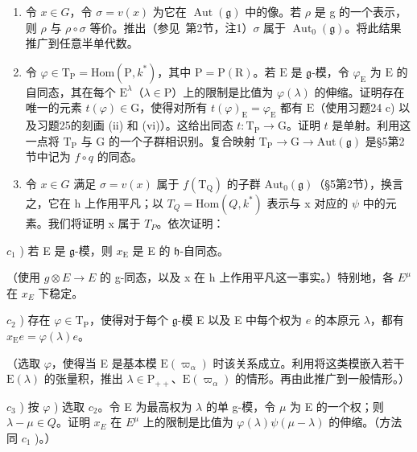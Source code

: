 \begin{enumerate}
\def\labelenumi{\alph{enumi})}
\item
  令 \(x \in G\)，令 \(\sigma = v(x)\) 为它在 \(\operatorname{Aut}(\mathfrak{g})\) 中的像。若 \(\rho\) 是 g 的一个表示，则 \(\rho\) 与 \(\rho \circ \sigma\) 等价。推出（参见~第2节，注1）\(\sigma\) 属于 \(\operatorname{Aut}_{0}(\mathfrak{g})\)。将此结果推广到任意半单代数。
\item
  令 \(\varphi \in \mathrm{T}_{\mathrm{P}} = \mathrm{Hom}(\mathrm{P}, k^{*})\)，其中 \(\mathrm{P} = \mathrm{P}(\mathrm{R})\)。若 \(\mathrm{E}\) 是 \(\mathfrak{g}\)-模，令 \(\varphi_{\mathrm{E}}\) 为 \(\mathrm{E}\) 的自同态，其在每个 \(\mathrm{E}^{\lambda}\)（\(\lambda \in \mathrm{P}\)）上的限制是比值为 \(\varphi(\lambda)\) 的伸缩。证明存在唯一的元素 \(t(\varphi) \in \mathrm{G}\)，使得对所有 \(t(\varphi)_{\mathrm{E}} = \varphi_{\mathrm{E}}\) 都有 \(\mathrm{E}\)（使用习题24 c) 以及习题25的刻画 (ii) 和 (vi)）。这给出同态 \(t: \mathrm{T}_{\mathrm{P}} \to \mathrm{G}\)。证明 \(t\) 是单射。利用这一点将 \(\mathrm{T}_{\mathrm{P}}\) 与 \(\mathrm{G}\) 的一个子群相识别。复合映射 \(\mathrm{T}_{\mathrm{P}} \to \mathrm{G} \to \mathrm{Aut}(\mathfrak{g})\) 是§5第2节中记为 \(f \circ q\) 的同态。
\item
  令 \(x \in G\) 满足 \(\sigma = v(x)\) 属于 \(f(\mathrm{T}_{\mathrm{Q}})\) 的子群 \(\mathrm{Aut}_{0}(\mathfrak{g})\)（§5第2节），换言之，它在 h 上作用平凡；以 \(T_{Q} = \mathrm{Hom}(Q, k^{*})\) 表示与 x 对应的 \(\psi\) 中的元素。我们将证明 x 属于 \(T_{P}\)。依次证明：
\end{enumerate}

\(c_{1}\) ) 若 E 是 \(\mathfrak{g}\)-模，则 \(x_{\mathrm{E}}\) 是 E 的 \(\mathfrak{h}\)-自同态。

（使用 \(g \otimes E \to E\) 的 g-同态，以及 x 在 h 上作用平凡这一事实。）特别地，各 \(E^{\mu}\) 在 \(x_{E}\) 下稳定。

\(c_{2}\) ) 存在 \(\varphi \in \mathrm{T}_{\mathrm{P}}\)，使得对于每个 \(\mathfrak{g}\)-模 E 以及 E 中每个权为 \(e\) 的本原元 \(\lambda\)，都有 \(x_{\mathrm{E}}e = \varphi (\lambda)e\)。

（选取 \(\varphi\)，使得当 E 是基本模 \(\mathrm{E}(\varpi_{\alpha})\) 时该关系成立。利用将这类模嵌入若干 \(\mathrm{E}(\lambda)\) 的张量积，推出 \(\lambda \in \mathrm{P}_{++}\)、\(\mathrm{E}(\varpi_{\alpha})\) 的情形。再由此推广到一般情形。）

\(c_{3}\) ) 按 \(\varphi\) ) 选取 \(c_{2}\)。令 E 为最高权为 \(\lambda\) 的单 g-模，令 \(\mu\) 为 E 的一个权；则 \(\lambda - \mu \in Q\)。证明 \(x_{E}\) 在 \(E^{\mu}\) 上的限制是比值为 \(\varphi(\lambda)\psi(\mu - \lambda)\) 的伸缩。（方法同 \(c_{1}\) )。）

